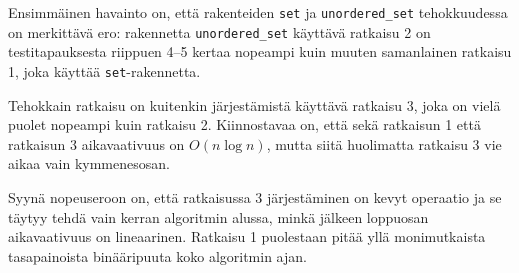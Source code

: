 Ensimmäinen havainto on, että rakenteiden
\texttt{set} ja \texttt{unordered\_set}
tehokkuudessa on merkittävä ero:
rakennetta \texttt{unordered\_set}
käyttävä ratkaisu 2 on testitapauksesta
riippuen 4–5 kertaa nopeampi
kuin muuten samanlainen ratkaisu 1,
joka käyttää \texttt{set}-rakennetta.

Tehokkain ratkaisu on kuitenkin järjestämistä
käyttävä ratkaisu 3, joka on vielä puolet
nopeampi kuin ratkaisu 2.
Kiinnostavaa on, että sekä ratkaisun 1 että
ratkaisun 3 aikavaativuus on $O(n \log n)$,
mutta siitä huolimatta
ratkaisu 3 vie aikaa vain kymmenesosan.

Syynä nopeuseroon on, että
ratkaisussa 3 järjestäminen on kevyt
operaatio ja se täytyy tehdä vain kerran
algoritmin alussa, minkä jälkeen loppuosan
aikavaativuus on lineaarinen.
Ratkaisu 1 puolestaan pitää yllä monimutkaista
tasapainoista binääripuuta koko algoritmin ajan.

